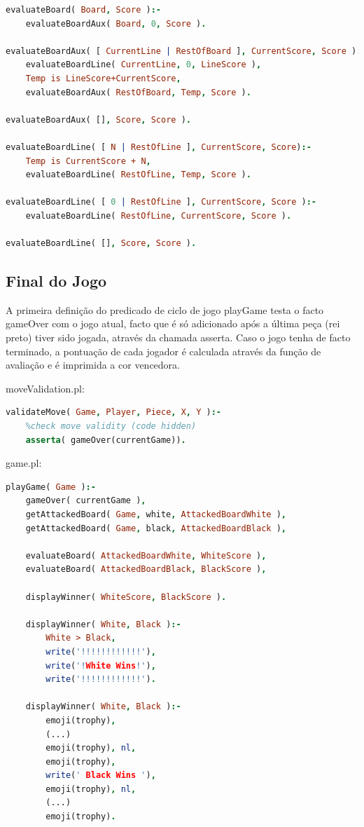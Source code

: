 \documentclass[a4paper]{article}
\begin{document}
\begin{small}
\begin{lstlisting}[language=Prolog]
evaluateBoard( Board, Score ):-
	evaluateBoardAux( Board, 0, Score ).

evaluateBoardAux( [ CurrentLine | RestOfBoard ], CurrentScore, Score ):-
	evaluateBoardLine( CurrentLine, 0, LineScore ),
	Temp is LineScore+CurrentScore,
	evaluateBoardAux( RestOfBoard, Temp, Score ).

evaluateBoardAux( [], Score, Score ).

evaluateBoardLine( [ N | RestOfLine ], CurrentScore, Score):-
	Temp is CurrentScore + N,
	evaluateBoardLine( RestOfLine, Temp, Score ).

evaluateBoardLine( [ 0 | RestOfLine ], CurrentScore, Score ):-
	evaluateBoardLine( RestOfLine, CurrentScore, Score ).

evaluateBoardLine( [], Score, Score ).
\end{lstlisting}
\end{small}

\subsection{Final do Jogo}
A primeira definição do predicado de ciclo de jogo playGame testa o facto gameOver com o jogo atual, facto que é só adicionado após a última peça (rei preto) tiver sido jogada, através da chamada asserta.
Caso o jogo tenha de facto terminado, a pontuação de cada jogador é calculada através da função de avaliação e é imprimida a cor vencedora.

\begin{small}
moveValidation.pl:
\begin{lstlisting}[language=Prolog]
% final move, black king needs to be played
validateMove( Game, Player, Piece, X, Y ):-
    %check move validity (code hidden)
    asserta( gameOver(currentGame)).
\end{lstlisting}
\end{small}

\begin{small}
game.pl:
\begin{lstlisting}[language=Prolog]
playGame( Game ):-
    gameOver( currentGame ),
    getAttackedBoard( Game, white, AttackedBoardWhite ),
    getAttackedBoard( Game, black, AttackedBoardBlack ),

    evaluateBoard( AttackedBoardWhite, WhiteScore ),
    evaluateBoard( AttackedBoardBlack, BlackScore ),

    displayWinner( WhiteScore, BlackScore ).

    displayWinner( White, Black ):-
    	White > Black,
    	write('!!!!!!!!!!!!'),
    	write('!White Wins!'),
    	write('!!!!!!!!!!!!').

    displayWinner( White, Black ):-
    	emoji(trophy),
        (...)
    	emoji(trophy), nl,
    	emoji(trophy),
    	write(' Black Wins '),
    	emoji(trophy), nl,
    	(...)
    	emoji(trophy).
\end{lstlisting}
\end{small}
\end{document}
